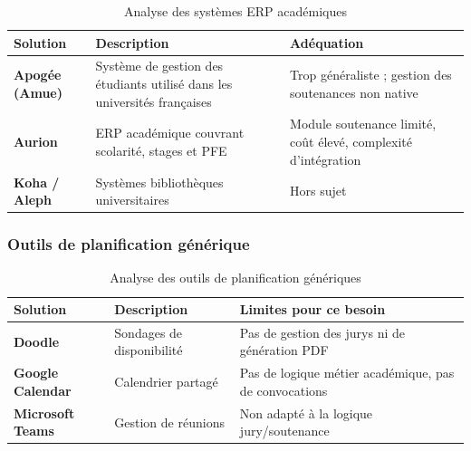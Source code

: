 \documentclass[12pt,a4paper]{article}
\begin{document}
\begin{table}[H]
    \centering
    \small
    \begin{tabular}{lp{5.5cm}p{5.5cm}}
        \toprule
        \rowcolor{primary!10}
        \textbf{Solution}                                                        & \textbf{Description} & \textbf{Adéquation} \\
        \midrule
        \textbf{Apogée (Amue)}                                                   &
        Système de gestion des étudiants utilisé dans les universités françaises &
        Trop généraliste ; gestion des soutenances non native                                                                 \\
        \addlinespace
        \textbf{Aurion}                                                          &
        ERP académique couvrant scolarité, stages et PFE                         &
        Module soutenance limité, coût élevé, complexité d'intégration                                                        \\
        \addlinespace
        \textbf{Koha / Aleph}                                                    &
        Systèmes bibliothèques universitaires                                    &
        Hors sujet                                                                                                            \\
        \bottomrule
    \end{tabular}
    \caption{Analyse des systèmes ERP académiques}
    \label{tab:erp}
\end{table}

\subsubsection{Outils de planification générique}
\label{subsubsec:planification_generique}

\begin{table}[H]
    \centering
    \small
    \begin{tabular}{lp{5.5cm}p{5.5cm}}
        \toprule
        \rowcolor{primary!10}
        \textbf{Solution}        & \textbf{Description}      & \textbf{Limites pour ce besoin}                       \\
        \midrule
        \textbf{Doodle}          & Sondages de disponibilité & Pas de gestion des jurys ni de génération PDF         \\
        \addlinespace
        \textbf{Google Calendar} & Calendrier partagé        & Pas de logique métier académique, pas de convocations \\
        \addlinespace
        \textbf{Microsoft Teams} & Gestion de réunions       & Non adapté à la logique jury/soutenance               \\
        \bottomrule
    \end{tabular}
    \caption{Analyse des outils de planification génériques}
    \label{tab:planification}
\end{table}
\end{document}
